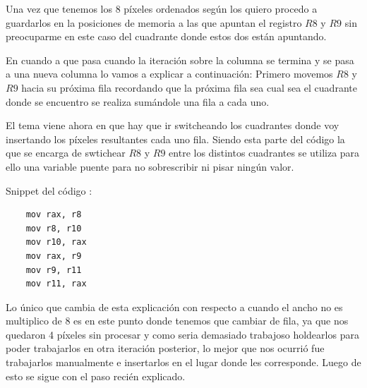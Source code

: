 \begin{center}
\end{center}


Una vez que tenemos los 8 píxeles ordenados según los quiero procedo a guardarlos en la posiciones de memoria a las que apuntan el registro $R8$ y $R9$ sin preocuparme en este caso del cuadrante donde estos dos están apuntando.

En cuando a que pasa cuando la iteración sobre la columna se termina y se pasa a una nueva columna lo vamos a explicar a continuación:
Primero movemos $R8$ y $R9$ hacia su próxima fila recordando que la próxima fila sea cual sea el cuadrante donde se encuentro se realiza sumándole una fila a cada uno.

El tema viene ahora en que hay que ir switcheando los cuadrantes donde voy insertando los píxeles resultantes cada uno fila. Siendo esta parte del código la que se encarga de swtichear $R8$ y $R9$ entre los distintos cuadrantes se utiliza para ello una variable puente para no sobrescribir ni pisar ningún valor. 

Snippet del código :

\begin{lstlisting}
	mov rax, r8
	mov r8, r10
	mov r10, rax
	mov rax, r9
	mov r9, r11
	mov r11, rax
\end{lstlisting}

Lo único que cambia de esta explicación con respecto a cuando el ancho no es multiplico de 8 es en este punto donde tenemos que cambiar de fila, ya que nos quedaron 4 píxeles sin procesar y como seria demasiado trabajoso holdearlos para poder trabajarlos en otra iteración posterior, lo mejor que nos ocurrió fue trabajarlos manualmente e insertarlos en el lugar donde les corresponde. Luego de esto se sigue con el paso recién explicado.


